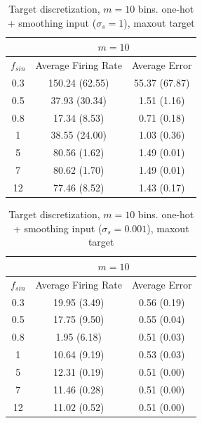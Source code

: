 \documentclass[10pt,a4paper, final]{report} %
\begin{document}
\begin{table}[H]
\centering
\begin{tabular}{c|c|c|}
\cline{2-3}
                          & \multicolumn{2}{|c|}{$m= 10$}            \\ \hline
\multicolumn{1}{|c|}{$f_{sin}$} & Average Firing Rate & Average Error     \\ \hline
\multicolumn{1}{|c|}{0.3} & 150.24 (62.55) & 55.37 (67.87) \\
\multicolumn{1}{|c|}{0.5} & 37.93 (30.34)  &  1.51 (1.16) \\
\multicolumn{1}{|c|}{0.8} & 17.34 (8.53)  & 0.71 (0.18) \\
\multicolumn{1}{|c|}{1}   & 38.55 (24.00)  & 1.03 (0.36) \\
\multicolumn{1}{|c|}{5}   &  80.56 (1.62) & 1.49 (0.01) \\
\multicolumn{1}{|c|}{7}   &  80.62 (1.70) & 1.49 (0.01) \\
\multicolumn{1}{|c|}{12}  &  77.46 (8.52) & 1.43 (0.17) \\ \hline
\end{tabular}
\caption{Target discretization, $m=10$ bins. one-hot + smoothing input ($\sigma_s = 1$), maxout target}
\label{tab:one_hot_smoothed_input_maxout_target_sigma_1}
\end{table}

\begin{table}[H]
\centering
\begin{tabular}{c|c|c|}
\cline{2-3}
                          & \multicolumn{2}{|c|}{$m= 10$}            \\ \hline
\multicolumn{1}{|c|}{$f_{sin}$} & Average Firing Rate & Average Error     \\ \hline
\multicolumn{1}{|c|}{0.3} & 19.95 (3.49) & 0.56 (0.19)\\
\multicolumn{1}{|c|}{0.5} & 17.75 (9.50)  & 0.55 (0.04)  \\
\multicolumn{1}{|c|}{0.8} & 1.95 (6.18)  & 0.51 (0.03) \\
\multicolumn{1}{|c|}{1}   & 10.64 (9.19)  & 0.53 (0.03) \\
\multicolumn{1}{|c|}{5}   & 12.31 (0.19)  & 0.51 (0.00) \\
\multicolumn{1}{|c|}{7}   & 11.46 (0.28)  & 0.51 (0.00) \\
\multicolumn{1}{|c|}{12}  & 11.02 (0.52) & 0.51 (0.00) \\ \hline
\end{tabular}
\caption{Target discretization, $m=10$ bins. one-hot + smoothing input ($\sigma_s = 0.001$), maxout target}
\label{tab:one_hot_smoothed_input_maxout_target_sigma_0_001}
\end{table}
\end{document}
